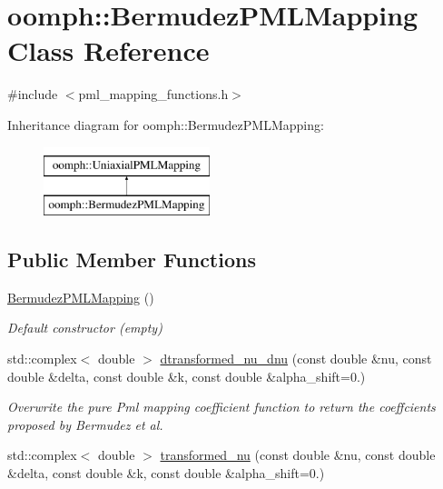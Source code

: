 \hypertarget{classoomph_1_1BermudezPMLMapping}{}\section{oomph\+:\+:Bermudez\+P\+M\+L\+Mapping Class Reference}
\label{classoomph_1_1BermudezPMLMapping}


{\ttfamily \#include $<$pml\+\_\+mapping\+\_\+functions.\+h$>$}

Inheritance diagram for oomph\+:\+:Bermudez\+P\+M\+L\+Mapping\+:\begin{figure}[H]
\begin{center}
\leavevmode
\includegraphics[height=2.000000cm]{classoomph_1_1BermudezPMLMapping}
\end{center}
\end{figure}
\subsection*{Public Member Functions}
\begin{DoxyCompactItemize}
\item 
\hyperlink{classoomph_1_1BermudezPMLMapping_a042e18373f3f5b6cc9611a0ceb4391a3}{Bermudez\+P\+M\+L\+Mapping} ()
\begin{DoxyCompactList}\small\item\em Default constructor (empty) \end{DoxyCompactList}\item 
std\+::complex$<$ double $>$ \hyperlink{classoomph_1_1BermudezPMLMapping_adf727a41969fc98de8122c502d562c57}{dtransformed\+\_\+nu\+\_\+dnu} (const double \&nu, const double \&delta, const double \&k, const double \&alpha\+\_\+shift=0.)
\begin{DoxyCompactList}\small\item\em Overwrite the pure Pml mapping coefficient function to return the coeffcients proposed by Bermudez et al. \end{DoxyCompactList}\item 
std\+::complex$<$ double $>$ \hyperlink{classoomph_1_1BermudezPMLMapping_a668c619f65e0570fdf97e0e24026593e}{transformed\+\_\+nu} (const double \&nu, const double \&delta, const double \&k, const double \&alpha\+\_\+shift=0.)
\end{DoxyCompactItemize}


